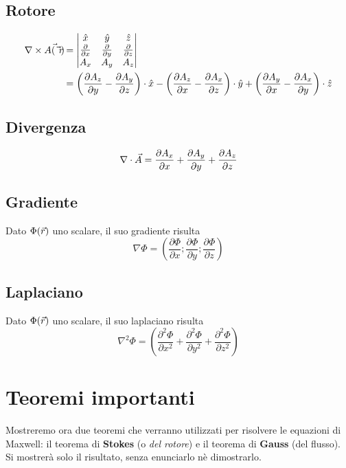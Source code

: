 \subsection{Rotore}
\begin{equation} \begin{split}
  \nabla\times \vec{A(\vec{r})} &=
  \begin{vmatrix}
    \hat{x} &\hat{y} &\hat{z} \\
    \frac{\partial}{\partial x} & \frac{\partial}{\partial y} & \frac{\partial}{\partial z} \\
    A_x & A_y & A_z
  \end{vmatrix} \\
  &= \left(\frac{\partial A_z}{\partial y} - \frac{\partial A_y}{\partial z}\right)\cdot \hat{x} -
  \left(\frac{\partial A_z}{\partial x} - \frac{\partial A_x}{\partial z}\right)\cdot \hat{y} +
  \left(\frac{\partial A_y}{\partial x} - \frac{\partial A_x}{\partial y}\right)\cdot \hat{z}
\end{split}\end{equation}

\subsection{Divergenza}
\begin{equation}
  \nabla\cdot \vec{A} = \frac{\partial A_x}{\partial x} + \frac{\partial A_y}{\partial y} + \frac{\partial A_z}{\partial z}
\end{equation}
\subsection{Gradiente}
Dato $\Phi(\vec{r})$ uno scalare, il suo gradiente risulta
\begin{equation}
  \nabla \Phi = \left(\frac{\partial \Phi}{\partial x} ; \frac{\partial \Phi}{\partial y}; \frac{\partial \Phi}{\partial z}\right)
\end{equation}
\subsection{Laplaciano}
Dato $\Phi(\vec{r})$ uno scalare, il suo laplaciano risulta
\begin{equation}
  \nabla^2 \Phi = \left(\frac{\partial^2 \Phi}{\partial x^2} + \frac{\partial^2 \Phi}{\partial y^2} + \frac{\partial^2 \Phi}{\partial z^2}\right)
\end{equation}

\section{Teoremi importanti}
Mostreremo ora due teoremi che verranno utilizzati per risolvere le equazioni di Maxwell:
il teorema di \textbf{Stokes} (o \textit{del rotore}) e il teorema di \textbf{Gauss} (del flusso).
Si mostrerà solo il risultato, senza enunciarlo nè dimostrarlo.

